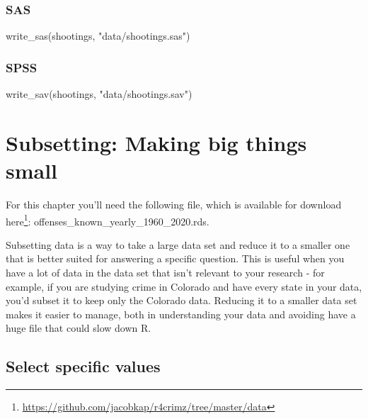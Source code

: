 \documentclass[
]{krantz}
\makeatletter
\newenvironment{Shaded}{\begin{snugshade}}{\end{snugshade}}
\newcommand{\FunctionTok}[1]{\textcolor[rgb]{0,0,0}{#1}}
\newcommand{\NormalTok}[1]{#1}
\newcommand{\StringTok}[1]{\textcolor[rgb]{0.5,0.5,0.5}{#1}}
\renewcommand{\href}[2]{#2\footnote{\url{#1}}}
\newenvironment{kframe}{%
\medskip{}
\setlength{\fboxsep}{.8em}
 \def\at@end@of@kframe{}%
 \ifinner\ifhmode%
  \def\at@end@of@kframe{\end{minipage}}%
  \begin{minipage}{\columnwidth}%
 \fi\fi%
 \def\FrameCommand##1{\hskip\@totalleftmargin \hskip-\fboxsep
 \colorbox{shadecolor}{##1}\hskip-\fboxsep
     \hskip-\linewidth \hskip-\@totalleftmargin \hskip\columnwidth}%
 \MakeFramed {\advance\hsize-\width
   \@totalleftmargin\z@ \linewidth\hsize
   \@setminipage}}%
 {\par\unskip\endMakeFramed%
 \at@end@of@kframe}
\renewenvironment{Shaded}{\begin{kframe}}{\end{kframe}}
\makeatother
\begin{document}
\hypertarget{sas-1}{%
\subsection{SAS}\label{sas-1}}

\begin{Shaded}
\begin{Highlighting}[]
\FunctionTok{write\_sas}\NormalTok{(shootings, }\StringTok{"data/shootings.sas"}\NormalTok{)}
\end{Highlighting}
\end{Shaded}

\hypertarget{spss-1}{%
\subsection{SPSS}\label{spss-1}}

\begin{Shaded}
\begin{Highlighting}[]
\FunctionTok{write\_sav}\NormalTok{(shootings, }\StringTok{"data/shootings.sav"}\NormalTok{)}
\end{Highlighting}
\end{Shaded}

\hypertarget{subsetting-intro}{%
\chapter{Subsetting: Making big things small}\label{subsetting-intro}}

For this chapter you'll need the following file, which is available for download \href{https://github.com/jacobkap/r4crimz/tree/master/data}{here}: offenses\_known\_yearly\_1960\_2020.rds.

Subsetting data is a way to take a large data set and reduce it to a smaller one that is better suited for answering a specific question. This is useful when you have a lot of data in the data set that isn't relevant to your research - for example, if you are studying crime in Colorado and have every state in your data, you'd subset it to keep only the Colorado data. Reducing it to a smaller data set makes it easier to manage, both in understanding your data and avoiding have a huge file that could slow down R.

\hypertarget{select-specific-values}{%
\section{Select specific values}\label{select-specific-values}}
\end{document}
